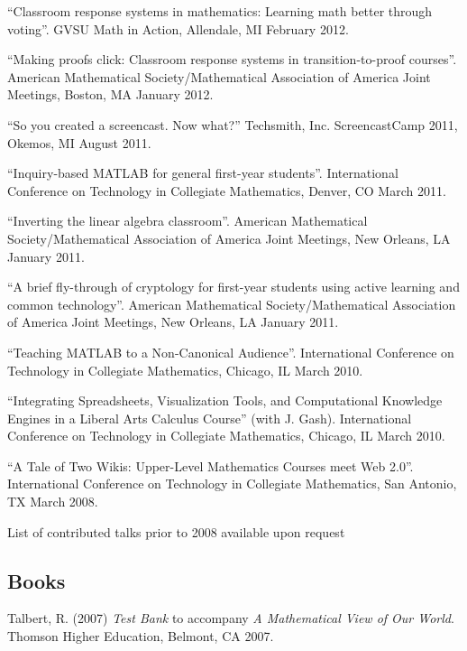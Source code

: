 \documentclass[letterpaper]{article}
\renewenvironment{itemize}{
  \begin{list}{}{
    \setlength{\leftmargin}{1.5em}
	\setlength{\itemsep}{0in}
  }
}{
  \end{list}
}
\begin{document}
\begin{itemize}
	\item ``Classroom response systems in mathematics: Learning math better through voting''. GVSU Math in Action, Allendale, MI February 2012. 
	\item ``Making proofs click: Classroom response systems in transition-to-proof courses''. American Mathematical Society/Mathematical Association of America Joint Meetings, Boston, MA January 2012. 
	\item ``So you created a screencast. Now what?'' Techsmith, Inc. ScreencastCamp 2011, Okemos, MI August 2011. 
	\item ``Inquiry-based MATLAB for general first-year students''. International Conference on Technology in Collegiate Mathematics, Denver, CO March 2011. 
	\item ``Inverting the linear algebra classroom''. American Mathematical Society/Mathematical Association of America Joint Meetings, New Orleans, LA January 2011.
	\item ``A brief fly-through of cryptology for first-year students using active learning and common technology''.   American Mathematical Society/Mathematical Association of America Joint Meetings, New Orleans, LA January 2011.
	\item ``Teaching MATLAB to a Non-Canonical Audience''. International Conference on Technology in Collegiate Mathematics, Chicago, IL March 2010. 
	\item ``Integrating Spreadsheets, Visualization Tools, and Computational Knowledge Engines in a Liberal Arts Calculus Course'' (with J. Gash). International Conference on Technology in Collegiate Mathematics, Chicago, IL March 2010.
	\item ``A Tale of Two Wikis: Upper-Level Mathematics Courses meet Web 2.0''. International Conference on Technology in Collegiate Mathematics, San Antonio, TX March 2008.
\end{itemize}

\begin{center}
  \begin{footnotesize}
    List of contributed talks prior to 2008 available upon request
  \end{footnotesize}
\end{center}

\subsection*{Books}
\begin{itemize}
	\item Talbert, R. (2007) \emph{Test Bank} to accompany \emph{A Mathematical View of Our World}. Thomson Higher Education, Belmont, CA 2007.
\end{itemize}
\end{document}
